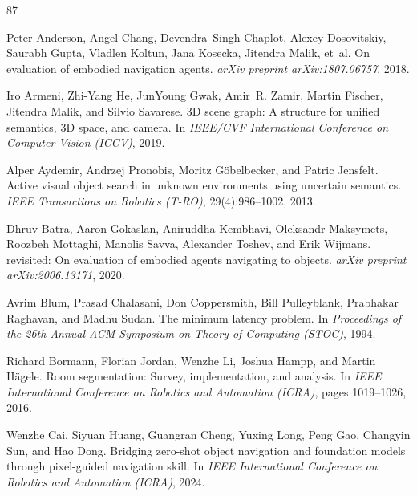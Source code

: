 \documentclass[10pt]{article}
\begin{document}
\clearpage
\begin{thebibliography}{87}
\providecommand{\natexlab}[1]{#1}

Peter Anderson, Angel Chang, Devendra~Singh Chaplot, Alexey Dosovitskiy, Saurabh Gupta, Vladlen Koltun, Jana Kosecka, Jitendra Malik, et~al.
\newblock On evaluation of embodied navigation agents.
\newblock \emph{arXiv preprint arXiv:1807.06757}, 2018.

Iro Armeni, Zhi-Yang He, JunYoung Gwak, Amir~R. Zamir, Martin Fischer, Jitendra Malik, and Silvio Savarese.
\newblock 3D scene graph: A structure for unified semantics, 3D space, and camera.
\newblock In \emph{IEEE/CVF International Conference on Computer Vision (ICCV)}, 2019.

Alper Aydemir, Andrzej Pronobis, Moritz G{\"o}belbecker, and Patric Jensfelt.
\newblock Active visual object search in unknown environments using uncertain semantics.
\newblock \emph{IEEE Transactions on Robotics (T-RO)}, 29(4):986--1002, 2013.

Dhruv Batra, Aaron Gokaslan, Aniruddha Kembhavi, Oleksandr Maksymets, Roozbeh Mottaghi, Manolis Savva, Alexander Toshev, and Erik Wijmans.
 revisited: On evaluation of embodied agents navigating to objects.
\newblock \emph{arXiv preprint arXiv:2006.13171}, 2020.

Avrim Blum, Prasad Chalasani, Don Coppersmith, Bill Pulleyblank, Prabhakar Raghavan, and Madhu Sudan.
\newblock The minimum latency problem.
\newblock In \emph{Proceedings of the 26th Annual ACM Symposium on Theory of Computing (STOC)}, 1994.

Richard Bormann, Florian Jordan, Wenzhe Li, Joshua Hampp, and Martin H\"{a}gele.
\newblock Room segmentation: Survey, implementation, and analysis.
\newblock In \emph{IEEE International Conference on Robotics and Automation (ICRA)}, pages 1019--1026, 2016.

Wenzhe Cai, Siyuan Huang, Guangran Cheng, Yuxing Long, Peng Gao, Changyin Sun, and Hao Dong.
\newblock Bridging zero-shot object navigation and foundation models through pixel-guided navigation skill.
\newblock In \emph{IEEE International Conference on Robotics and Automation (ICRA)}, 2024.


\end{thebibliography}
\end{document}
